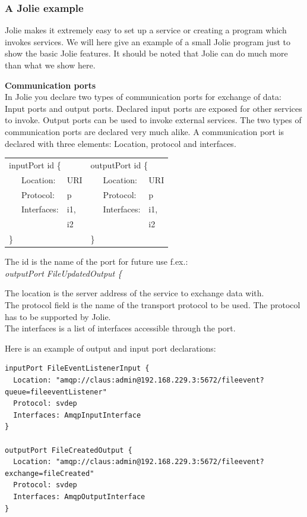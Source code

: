 \subsubsection{A Jolie example}
Jolie makes it extremely easy to set up a service or creating a program which invokes services. We will here give an example of a small Jolie program just to show the basic Jolie features. It should be noted that Jolie can do much more than what we show here.

\noindent\textbf{Communication ports}\\
In Jolie you declare two types of communication ports for exchange of data: Input ports and output ports. Declared input ports are exposed for other services to invoke. Output ports can be used to invoke external services. The two types of communication ports are declared very much alike. A communication port is declared with three elements: Location, protocol and interfaces.

\begin{center}
  \begin{tabular}[H]{p{1cm} l l | p{1cm} l l}
    \multicolumn{3}{l}{inputPort id \{} & \multicolumn{3}{l}{outputPort id \{}\\
    & Location: & URI & & Location: & URI\\
    & Protocol: & p & & Protocol: & p\\
    & Interfaces: & i1, & & Interfaces: & i1,\\
    & & i2 & & & i2\\
    \} & & & \} &
  \end{tabular}
\end{center}

The id is the name of the port for future use f.ex.:\\
\indent\textit{outputPort FileUpdatedOutput \{}

The location is the server address of the service to exchange data with.\\
The protocol field is the name of the transport protocol to be used. The protocol has to be supported by Jolie.\\
The interfaces is a list of interfaces accessible through the port.

Here is an example of output and input port declarations:

\begin{lstlisting}
inputPort FileEventListenerInput {
  Location: "amqp://claus:admin@192.168.229.3:5672/fileevent?queue=fileeventListener"
  Protocol: svdep
  Interfaces: AmqpInputInterface
}

outputPort FileCreatedOutput {
  Location: "amqp://claus:admin@192.168.229.3:5672/fileevent?exchange=fileCreated"
  Protocol: svdep
  Interfaces: AmqpOutputInterface
}
\end{lstlisting}

